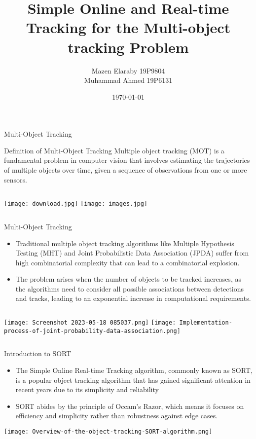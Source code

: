 \documentclass{beamer}
\title[SORT]{Simple Online and Real-time Tracking for the Multi-object tracking Problem}
\author{Mazen Elaraby 19P9804 \\Muhammad Ahmed 19P6131}
\institute{Ain Shams University}
\date{\today}
\begin{document}
\begin{frame}
\titlepage
\end{frame}

\begin{frame}[t]{Multi-Object Tracking}
\begin{block}{Definition of Multi-Object Tracking}
Multiple object tracking (MOT) is a fundamental problem in computer vision that involves estimating the trajectories of multiple objects over time, given a sequence of observations from one or
more sensors.
\end{block}
\vspace{0.2 in}
\begin{columns}[onlytextwidth]
\texttt{[image: download.jpg]}
\texttt{[image: images.jpg]}
\end{columns}
\end{frame}

\begin{frame}[t]{Multi-Object Tracking}
\begin{itemize}
\item Traditional multiple object tracking algorithms like Multiple Hypothesis Testing (MHT) and
Joint Probabilistic Data Association (JPDA) suffer from high combinatorial complexity that can
lead to a combinatorial explosion.
\item The problem arises when the number of objects to be tracked
increases, as the algorithms need to consider all possible associations between detections and tracks,
leading to an exponential increase in computational requirements.
\end{itemize}
\vspace{0.2 in}
\begin{columns}[onlytextwidth]
\texttt{[image: Screenshot 2023-05-18 085037.png]}
\texttt{[image: Implementation-process-of-joint-probability-data-association.png]}
\end{columns}

\end{frame}

\begin{frame}[t]{Introduction to SORT}
\begin{itemize}
\item The Simple Online Real-time Tracking algorithm, commonly known as SORT, is a popular object
tracking algorithm that has gained significant attention in recent years due to its simplicity and
reliability
\item  SORT abides by the principle of Occam’s Razor,
which means it focuses on efficiency and simplicity rather than robustness against edge cases. 
\end{itemize}
\begin{center}
\texttt{[image: Overview-of-the-object-tracking-SORT-algorithm.png]}
\end{center}
\end{frame}
\end{document}
